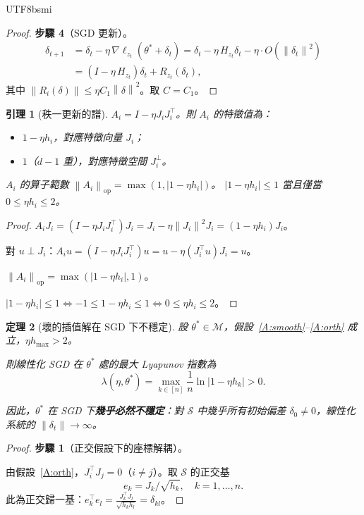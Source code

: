 \documentclass[11pt,a4paper]{article}
\newtheorem{theorem}{定理}
\newtheorem{lemma}[theorem]{引理}
\theoremstyle{definition}
\newcommand{\cM}{\mathcal{M}}
\newcommand{\cS}{\mathcal{S}}
\newcommand{\norm}[1]{\left\|#1\right\|}
\begin{document}
\begin{CJK}{UTF8}{bsmi}
\begin{proof}
  \textbf{步驟 4}（SGD 更新）。
  \begin{align*}
    \delta_{t+1}
    &=\delta_t-\eta\,\nabla\ell_{z_t}(\theta^*+\delta_t)
    =\delta_t-\eta\,H_{z_t}\delta_t-\eta\cdot O(\norm{\delta_t}^2)\\
    &=(I-\eta\,H_{z_t})\delta_t+R_{z_t}(\delta_t),
  \end{align*}
  其中 $\norm{R_i(\delta)}\leq\eta C_1\norm{\delta}^2$。取 $C=C_1$。
\end{proof}

\begin{lemma}[秩一更新的譜]\label{lem:rank1}
  $A_i=I-\eta J_iJ_i^\top$。則 $A_i$ 的特徵值為：
  \begin{itemize}
    \item $1-\eta h_i$，對應特徵向量 $J_i$；
    \item $1$（$d-1$ 重），對應特徵空間 $J_i^\perp$。
  \end{itemize}
  $A_i$ 的算子範數 $\norm{A_i}_{\mathrm{op}}=\max(1,|1-\eta h_i|)$。
  $|1-\eta h_i|\leq 1$ 當且僅當 $0\leq\eta h_i\leq 2$。
\end{lemma}

\begin{proof}
  $A_i J_i=(I-\eta J_iJ_i^\top)J_i=J_i-\eta\norm{J_i}^2 J_i=(1-\eta h_i)J_i$。

  對 $u\perp J_i$：$A_i u=(I-\eta J_iJ_i^\top)u=u-\eta(J_i^\top u)J_i=u$。

  $\norm{A_i}_{\mathrm{op}}=\max(|1-\eta h_i|,1)$。

  $|1-\eta h_i|\leq 1\iff -1\leq 1-\eta h_i\leq 1\iff 0\leq\eta h_i\leq 2$。
\end{proof}

\begin{theorem}[壞的插值解在 SGD 下不穩定]\label{thm:A}
  設 $\theta^*\in\cM$，假設~\ref{A:smooth}--\ref{A:orth} 成立，$\eta h_{\max}>2$。

  則線性化 SGD 在 $\theta^*$ 處的最大 Lyapunov 指數為
  \[
    \lambda(\eta,\theta^*)=\max_{k\in[n]}\frac{1}{n}\ln|1-\eta h_k|>0.
  \]

  因此，$\theta^*$ 在 SGD 下\textbf{幾乎必然不穩定}：對 $\cS$ 中幾乎所有初始偏差 $\delta_0\neq 0$，線性化系統的 $\norm{\delta_t}\to\infty$。
\end{theorem}

\begin{proof}
  \textbf{步驟 1}（正交假設下的座標解耦）。

  由假設~\ref{A:orth}，$J_i^\top J_j=0$（$i\neq j$）。取 $\cS$ 的正交基
  \[
    e_k=J_k/\sqrt{h_k},\quad k=1,\ldots,n.
  \]
  此為正交歸一基：$e_k^\top e_l=\frac{J_k^\top J_l}{\sqrt{h_k h_l}}=\delta_{kl}$。


\end{proof}
\end{CJK}
\end{document}
